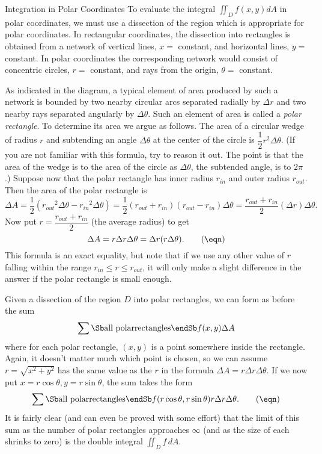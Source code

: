 \subhead Integration in Polar Coordinates \endsubhead
To evaluate the integral $\iint_D f(x,y) dA$ in polar
coordinates, we must use a dissection of the region which
is appropriate for polar coordinates.    In rectangular
coordinates, the dissection into rectangles is
obtained from a network of vertical lines, $x = $ constant,
and horizontal lines, $y = $ constant.   In polar coordinates
the corresponding network would consist of concentric circles,
$r = $ constant, and rays from the origin, $\theta = $ constant.
\medskip
\centerline{}
\medskip
As indicated in the diagram, a typical element of area produced
by such a network is bounded by two nearby circular arcs
separated radially by $\Delta r$ and two nearby rays separated
angularly by $\Delta \theta$.  Such an element of area is
called a {\it polar rectangle}.  To determine its area we
%
argue as follows.  The area of a circular wedge of radius
$r$ and subtending an angle $\Delta \theta$ at the center of
the circle is $\dfrac 12 r^2\Delta\theta$.  (If you are not
familiar with this formula, try to reason it out.  The point is
that the area of the wedge is to the area of the circle as
$\Delta\theta$, the subtended angle, is to $2\pi$.)  Suppose
now that the polar rectangle has inner radius $r_{in}$ and
outer radius $r_{out}$.  Then the area of the polar rectangle
is
$$
\Delta A = \frac 12
 (r_{out}{}^2\Delta\theta -  
 r_{in}{}^2\Delta\theta) = \frac 12
 (r_{out} +   r_{in})  (r_{out} -   r_{in})\Delta\theta =
\frac{r_{out} +   r_{in}}2  (\Delta r)\Delta\theta.
  $$
Now put $r = \dfrac{r_{out} + r_{in}}2$ (the average radius)
to get
\nexteqn
$$
 \Delta A = r\Delta r \Delta\theta = \Delta r(r \Delta\theta).\tag\eqn
$$
This formula is an exact equality, but note that if we use any
other value of $r$  falling within the
range $r_{in} \le r \le  r_{out}$, it will only make a slight
difference in the answer if the polar rectangle is small enough.

Given a dissection of the region $D$ into polar rectangles, we
can form as before the sum
$$
     \sum\Sb\text{all polar}\\ \text{rectangles}\endSb
      f(x,y)\Delta A
$$
where for each polar rectangle, $(x,y)$ is a point somewhere inside
the rectangle.   Again, it doesn't matter much which point is chosen,
so we can assume $r = \sqrt{x^2 + y^2}$ has the same value as the
$r$ in the formula $\Delta A = r\Delta r \Delta\theta$.  If we
now put $x = r\cos\theta, y = r\sin\theta$, the sum takes the
form
\nexteqn
\xdef\PolDis{\eqn}
$$
     \sum\Sb\text{all polar}\\ \text{rectangles}\endSb
      f(r\cos\theta,r\sin\theta)r\Delta r \Delta\theta.\tag\eqn
$$
It is fairly clear (and can even be proved with some effort)
that the limit of this sum as the number of polar rectangles
approaches $\infty$ (and as the size of each shrinks to zero)
is the double integral
$\iint_D f \,dA$.   


